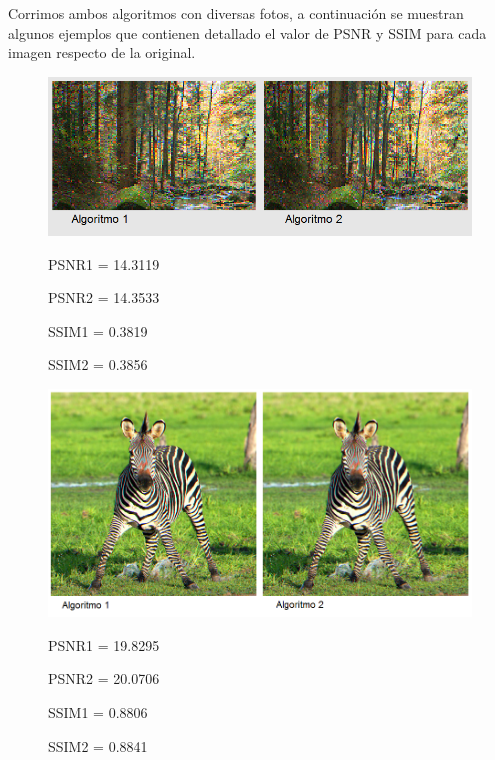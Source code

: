 \documentclass[a4paper]{article}
\begin{document}
Corrimos ambos algoritmos con diversas fotos, a continuaci\'on se muestran algunos ejemplos que contienen detallado el valor de PSNR y SSIM para cada imagen respecto de la original.

\begin{figure}[h!]
	\caption{}
	\begin{center}
	\includegraphics[scale=0.60]{imagenes/Vecino/arbolitos}
	\label{arbolitos}
	
	PSNR1 =   14.3119

PSNR2 =   14.3533

SSIM1 =    0.3819

SSIM2 =    0.3856
  \end{center}
\end{figure}

\begin{figure}[h!]
	\caption{}
	\begin{center}
	\includegraphics[scale=0.60]{imagenes/Vecino/zebraCara}
	\label{zebraCara}
	
PSNR1 =   19.8295

PSNR2 =   20.0706

SSIM1 =    0.8806

SSIM2 =    0.8841
  \end{center}
\end{figure}
\end{document}
